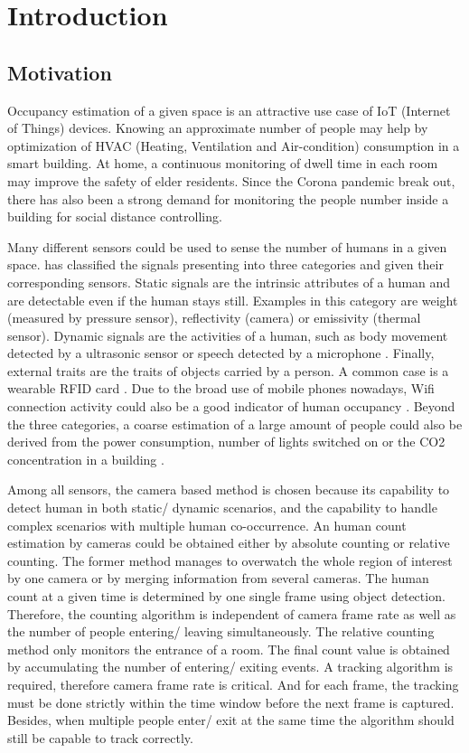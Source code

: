 \chapter{Introduction} \label{ch:intro}
\section{Motivation}
Occupancy estimation of a given space is an attractive use case of IoT (Internet of Things) devices. Knowing an approximate number of people may help by optimization of HVAC (Heating, Ventilation and Air-condition) consumption in a smart building. At home, a continuous monitoring of dwell time in each room may improve the safety of elder residents. Since the Corona pandemic break out, there has also been a strong demand for monitoring the people number inside a building for social distance controlling.

Many different sensors could be used to sense the number of humans in a given space. \citeauthor{humansense2010survey} \cite{humansense2010survey} has classified the signals presenting into three categories and given their corresponding sensors. Static signals are the intrinsic attributes of a human and are detectable even if the human stays still. Examples in this category are weight (measured by pressure sensor), reflectivity (camera) or emissivity (thermal sensor). Dynamic signals are the activities of a human, such as body movement detected by a ultrasonic sensor \cite{ultrasonic2012doorjamb} or speech detected by a microphone \cite{microphone}. Finally, external traits are the traits of objects carried by a person. A common case is a wearable RFID card \cite{RFID}. Due to the broad use of mobile phones nowadays, Wifi connection activity could also be a good indicator of human occupancy \cite{Wifi}. Beyond the three categories, a coarse estimation of a large amount of people could also be derived from the power consumption, number of lights switched on or the CO2 concentration in a building \cite{CO2}.

Among all sensors, the camera based method is chosen because its capability to detect human in both static/ dynamic scenarios, and the capability to handle complex scenarios with multiple human co-occurrence. An human count estimation by cameras could be obtained either by absolute counting or relative counting. The former method manages to overwatch the whole region of interest by one camera or by merging information from several cameras. The human count at a given time is determined by one single frame using object detection. Therefore, the counting algorithm is independent of camera frame rate as well as the number of people entering/ leaving simultaneously. The relative counting method only monitors the entrance of a room. The final count value is obtained by accumulating the number of entering/ exiting events. A tracking algorithm is required, therefore camera frame rate is critical. And for each frame, the tracking must be done strictly within the time window before the next frame is captured. Besides, when multiple people enter/ exit at the same time the algorithm should still be capable to track correctly.

